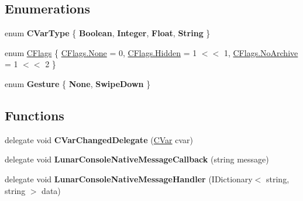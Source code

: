 \subsection*{Enumerations}
\begin{DoxyCompactItemize}
\item 
\mbox{\label{namespace_lunar_console_plugin_acc5d27eea9051942d76a6169f1bcd858}} 
enum {\bfseries C\+Var\+Type} \{ {\bfseries Boolean}, 
{\bfseries Integer}, 
{\bfseries Float}, 
{\bfseries String}
 \}
\item 
enum \mbox{\hyperlink{namespace_lunar_console_plugin_a7964ca4d001fe88527b3c508f034b34c}{C\+Flags}} \{ \mbox{\hyperlink{namespace_lunar_console_plugin_a7964ca4d001fe88527b3c508f034b34ca6adf97f83acf6453d4a6a4b1070f3754}{C\+Flags.\+None}} = 0, 
\mbox{\hyperlink{namespace_lunar_console_plugin_a7964ca4d001fe88527b3c508f034b34ca7acdf85c69cc3c5305456a293524386e}{C\+Flags.\+Hidden}} = 1 $<$$<$ 1, 
\mbox{\hyperlink{namespace_lunar_console_plugin_a7964ca4d001fe88527b3c508f034b34cab8aeb00bb1070f73393bb31ad8fb4b60}{C\+Flags.\+No\+Archive}} = 1 $<$$<$ 2
 \}
\item 
\mbox{\label{namespace_lunar_console_plugin_ac1cba1015f4007d05fabdf7d7ee2265b}} 
enum {\bfseries Gesture} \{ {\bfseries None}, 
{\bfseries Swipe\+Down}
 \}
\end{DoxyCompactItemize}
\subsection*{Functions}
\begin{DoxyCompactItemize}
\item 
\mbox{\label{namespace_lunar_console_plugin_a90288a77849906223888f99a062da264}} 
delegate void {\bfseries C\+Var\+Changed\+Delegate} (\mbox{\hyperlink{class_lunar_console_plugin_1_1_c_var}{C\+Var}} cvar)
\item 
\mbox{\label{namespace_lunar_console_plugin_a987bddf46fdeb5cb18d6943028416e46}} 
delegate void {\bfseries Lunar\+Console\+Native\+Message\+Callback} (string message)
\item 
\mbox{\label{namespace_lunar_console_plugin_a274c4c02e44f4841b0b464d645755bf9}} 
delegate void {\bfseries Lunar\+Console\+Native\+Message\+Handler} (I\+Dictionary$<$ string, string $>$ data)
\end{DoxyCompactItemize}


